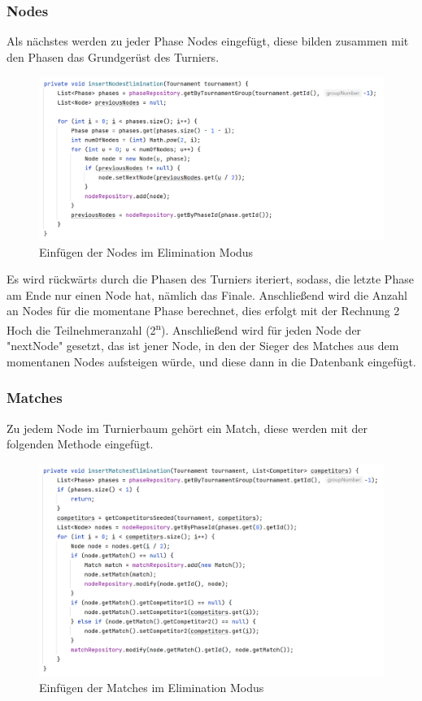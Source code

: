 \subsubsection{Nodes}

Als nächstes werden zu jeder Phase Nodes eingefügt, diese bilden zusammen mit den Phasen das Grundgerüst des Turniers. 

\begin{figure}[H]
    \includegraphics[scale=0.48]{pics/elimination_insertNodes.png}
    \caption{Einfügen der Nodes im Elimination Modus}
\end{figure}

Es wird rückwärts durch die Phasen des Turniers iteriert, sodass, die letzte Phase am Ende nur einen Node hat, nämlich das Finale.
Anschließend wird die Anzahl an Nodes für die momentane Phase berechnet, dies erfolgt mit der Rechnung 2 Hoch die Teilnehmeranzahl (2\textsuperscript{n}). 
Anschließend wird für jeden Node der "nextNode" gesetzt, das ist jener Node, in den der Sieger des Matches aus dem momentanen Nodes aufsteigen würde, 
und diese dann in die Datenbank eingefügt.

\subsubsection{Matches}

Zu jedem Node im Turnierbaum gehört ein Match, diese werden mit der folgenden Methode eingefügt.

\begin{figure}[H]
    \includegraphics[scale=0.48]{pics/elimination_insertMatches.png}
    \caption{Einfügen der Matches im Elimination Modus}
\end{figure}

